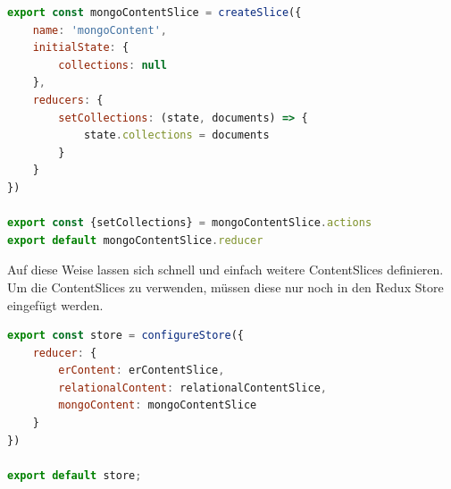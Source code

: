 \begin{lstlisting}[language=JavaScript, caption={MongoContentSlice},label={lst:fe_redux_slice}]
export const mongoContentSlice = createSlice({
    name: 'mongoContent',
    initialState: {
        collections: null
    },
    reducers: {
        setCollections: (state, documents) => {
            state.collections = documents
        }
    }
})

export const {setCollections} = mongoContentSlice.actions
export default mongoContentSlice.reducer
\end{lstlisting}

Auf diese Weise lassen sich schnell und einfach weitere ContentSlices definieren.
Um die ContentSlices zu verwenden, müssen diese nur noch in den Redux Store eingefügt werden.

\begin{lstlisting}[language=JavaScript, caption={Redux Store},label={lst:fe_redux_store}]
export const store = configureStore({
    reducer: {
        erContent: erContentSlice,
        relationalContent: relationalContentSlice,
        mongoContent: mongoContentSlice
    }
})

export default store;
\end{lstlisting}
